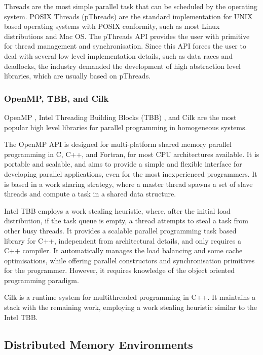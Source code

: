 Threads are the most simple parallel task that can be scheduled by the operating system. POSIX Threads (pThreads) are the standard implementation for UNIX based operating systems with POSIX conformity, such as most Linux distributions and Mac OS. The pThreads API provides the user with primitive for thread management and synchronisation. Since this API forces the user to deal with several low level implementation details, such as data races and deadlocks, the industry demanded the development of high abstraction level libraries, which are usually based on pThreads.

\subsubsection*{OpenMP, TBB, and Cilk}

OpenMP \cite{OpenMP}, Intel Threading Building Blocks (TBB) \cite{Intel:TBB}, and Cilk \cite{Intel:Cilk} are the most popular high level libraries for parallel programming in homogeneous systems.

The OpenMP API is designed for multi-platform shared memory parallel programming in C, C++, and Fortran, for most CPU architectures available. It is portable and scalable, and aims to provide a simple and flexible interface for developing parallel applications, even for the most inexperienced programmers. It is based in a work sharing strategy, where a master thread spawns a set of slave threads and compute a task in a shared data structure.

Intel TBB employs a work stealing heuristic, where, after the initial load distribution, if the task queue is empty, a thread attempts to steal a task from other busy threads. It provides a scalable parallel programming task based library for C++, independent from architectural details, and only requires a \intel C++ compiler. It automatically manages the load balancing and some cache optimisations, while offering parallel constructors and synchronisation primitives for the programmer. However, it requires knowledge of the object oriented programming paradigm.

Cilk is a runtime system for multithreaded programming in C++. It maintains a stack with the remaining work, employing a work stealing heuristic similar to the Intel TBB.

\subsection{Distributed Memory Environments}
\label{distributed_mem}

